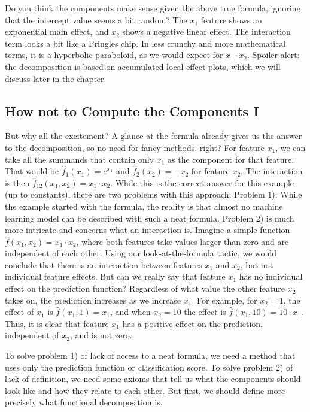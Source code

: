 \documentclass[
  11pt,
]{scrbook}
\begin{document}
Do you think the components make sense given the above true formula, ignoring that the intercept value seems a bit random?
The \(x_1\) feature shows an exponential main effect, and \(x_2\) shows a negative linear effect.
The interaction term looks a bit like a Pringles chip.
In less crunchy and more mathematical terms, it is a hyperbolic paraboloid, as we would expect for \(x_1 \cdot x_2\).
Spoiler alert: the decomposition is based on accumulated local effect plots, which we will discuss later in the chapter.

\hypertarget{how-not-to-compute-the-components-i}{%
\subsection{How not to Compute the Components I}\label{how-not-to-compute-the-components-i}}

But why all the excitement?
A glance at the formula already gives us the answer to the decomposition, so no need for fancy methods, right?
For feature \(x_1\), we can take all the summands that contain only \(x_1\) as the component for that feature.
That would be \(\hat{f}_1(x_1) = e^{x_1}\) and \(\hat{f}_2(x_2) = -x_2\) for feature \(x_2\).
The interaction is then \(\hat{f}_{12}(x_{1},x_{2}) = x_1 \cdot x_2\).
While this is the correct answer for this example (up to constants), there are two problems with this approach:
Problem 1): While the example started with the formula, the reality is that almost no machine learning model can be described with such a neat formula.
Problem 2) is much more intricate and concerns what an interaction is.
Imagine a simple function \(\hat{f}(x_1,x_2) = x_1 \cdot x_2\), where both features take values larger than zero and are independent of each other.
Using our look-at-the-formula tactic, we would conclude that there is an interaction between features \(x_1\) and \(x_2\), but not individual feature effects.
But can we really say that feature \(x_1\) has no individual effect on the prediction function?
Regardless of what value the other feature \(x_2\) takes on, the prediction increases as we increase \(x_1\).
For example, for \(x_2 = 1\), the effect of \(x_1\) is \(\hat{f}(x_1, 1) = x_1\), and when \(x_2 = 10\) the effect is \(\hat{f}(x_1, 10) = 10 \cdot x_1\).
Thus, it is clear that feature \(x_1\) has a positive effect on the prediction, independent of \(x_2\), and is not zero.

To solve problem 1) of lack of access to a neat formula, we need a method that uses only the prediction function or classification score.
To solve problem 2) of lack of definition, we need some axioms that tell us what the components should look like and how they relate to each other.
But first, we should define more precisely what functional decomposition is.
\end{document}
